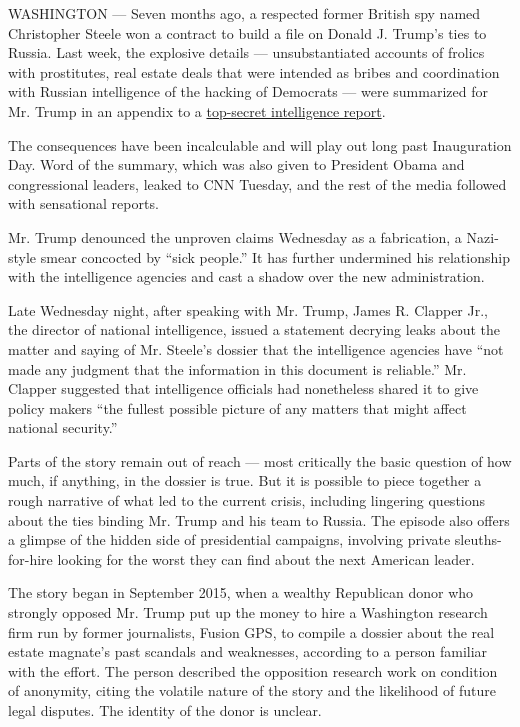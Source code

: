 WASHINGTON --- Seven months ago, a respected former British spy named
Christopher Steele won a contract to build a file on Donald J. Trump's
ties to Russia. Last week, the explosive details --- unsubstantiated
accounts of frolics with prostitutes, real estate deals that were
intended as bribes and coordination with Russian intelligence of the
hacking of Democrats --- were summarized for Mr. Trump in an appendix to
a
\href{https://www.nytimes3xbfgragh.onion/2017/01/06/us/politics/donald-trump-wall-hack-russia.html}{top-secret
intelligence report}.

The consequences have been incalculable and will play out long past
Inauguration Day. Word of the summary, which was also given to President
Obama and congressional leaders, leaked to CNN Tuesday, and the rest of
the media followed with sensational reports.

Mr. Trump denounced the unproven claims Wednesday as a fabrication, a
Nazi-style smear concocted by ``sick people.'' It has further undermined
his relationship with the intelligence agencies and cast a shadow over
the new administration.

Late Wednesday night, after speaking with Mr. Trump, James R. Clapper
Jr., the director of national intelligence, issued a statement decrying
leaks about the matter and saying of Mr. Steele's dossier that the
intelligence agencies have ``not made any judgment that the information
in this document is reliable.'' Mr. Clapper suggested that intelligence
officials had nonetheless shared it to give policy makers ``the fullest
possible picture of any matters that might affect national security.''

Parts of the story remain out of reach --- most critically the basic
question of how much, if anything, in the dossier is true. But it is
possible to piece together a rough narrative of what led to the current
crisis, including lingering questions about the ties binding Mr. Trump
and his team to Russia. The episode also offers a glimpse of the hidden
side of presidential campaigns, involving private sleuths-for-hire
looking for the worst they can find about the next American leader.

The story began in September 2015, when a wealthy Republican donor who
strongly opposed Mr. Trump put up the money to hire a Washington
research firm run by former journalists, Fusion GPS, to compile a
dossier about the real estate magnate's past scandals and weaknesses,
according to a person familiar with the effort. The person described the
opposition research work on condition of anonymity, citing the volatile
nature of the story and the likelihood of future legal disputes. The
identity of the donor is unclear.


